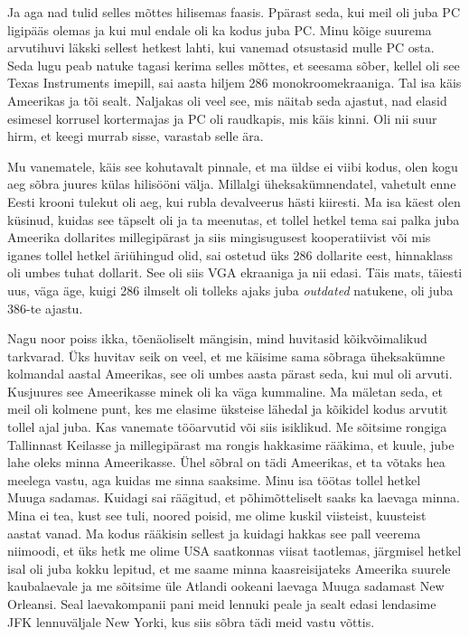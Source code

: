 
Ja aga nad tulid  selles mõttes  hilisemas faasis. Ppärast seda, kui meil oli juba PC ligipääs olemas ja kui mul endale oli ka kodus juba PC. Minu  kõige suurema arvutihuvi läkski sellest hetkest lahti, kui vanemad otsustasid mulle PC osta. Seda lugu peab natuke tagasi kerima selles mõttes, et seesama sõber, kellel oli  see Texas Instruments imepill, sai aasta hiljem 286  monokroomekraaniga. Tal isa käis Ameerikas ja  tõi sealt. Naljakas oli veel see, mis näitab seda ajastut, nad elasid esimesel korrusel kortermajas ja PC oli raudkapis, mis käis kinni. Oli nii suur hirm, et keegi murrab sisse, varastab selle ära.


Mu vanematele, käis see kohutavalt pinnale, et ma üldse ei viibi kodus, olen kogu aeg sõbra juures külas hilisööni välja. Millalgi üheksakümnendatel, vahetult enne Eesti krooni tulekut oli aeg, kui rubla devalveerus hästi kiiresti. Ma isa käest olen küsinud, kuidas see täpselt oli ja ta meenutas, et tollel hetkel tema sai palka juba Ameerika dollarites millegipärast ja siis mingisugusest kooperatiivist või mis iganes tollel hetkel äriühingud olid, sai ostetud üks 286 dollarite eest,  hinnaklass oli umbes tuhat dollarit. See oli siis VGA ekraaniga ja nii edasi. Täis mats, täiesti uus, väga äge, kuigi 286 ilmselt oli tolleks ajaks juba \emph{outdated}  natukene,  oli juba 386-te ajastu.


Nagu noor poiss ikka, tõenäoliselt mängisin, mind huvitasid kõikvõimalikud tarkvarad. Üks huvitav seik on veel, et me käisime sama sõbraga üheksakümne kolmandal aastal Ameerikas, see oli umbes aasta pärast seda, kui mul oli arvuti. Kusjuures see Ameerikasse minek oli ka väga kummaline. Ma mäletan seda, et meil oli  kolmene punt, kes me elasime üksteise lähedal ja  kõikidel kodus arvutit tollel ajal juba. Kas vanemate tööarvutid või siis isiklikud. Me sõitsime rongiga Tallinnast Keilasse ja millegipärast ma rongis hakkasime rääkima, et kuule, jube lahe oleks minna Ameerikasse. Ühel sõbral on tädi Ameerikas, et ta võtaks hea meelega vastu, aga kuidas me sinna saaksime. Minu isa töötas tollel hetkel Muuga sadamas. Kuidagi sai räägitud, et põhimõtteliselt saaks ka laevaga minna. Mina ei tea, kust see tuli, noored poisid, me olime kuskil viisteist, kuusteist aastat vanad. Ma kodus rääkisin sellest ja kuidagi hakkas see pall veerema niimoodi, et üks hetk me olime USA saatkonnas viisat taotlemas, järgmisel hetkel isal oli juba kokku lepitud, et me saame minna kaasreisijateks Ameerika suurele kaubalaevale ja me sõitsime üle Atlandi ookeani laevaga Muuga sadamast New Orleansi. Seal laevakompanii pani meid lennuki peale ja sealt edasi lendasime JFK lennuväljale New Yorki, kus siis sõbra tädi meid vastu võttis. 


